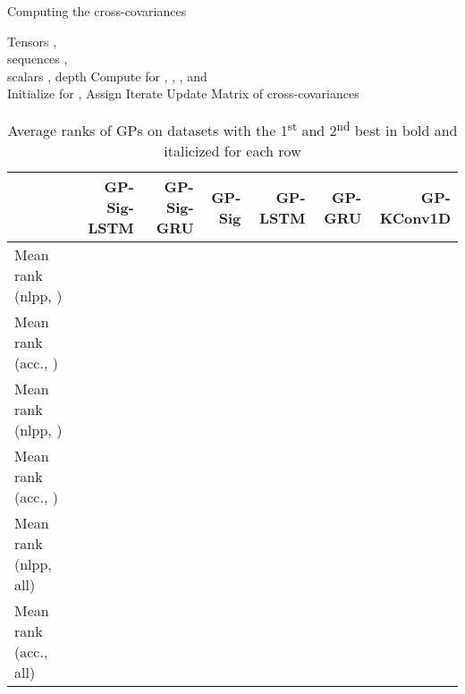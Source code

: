 \documentclass{article}
\begin{document}
	\begin{algorithm}[t]
		\caption{Computing the cross-covariances }
		\label{alg:cross_cov}
		\begin{algorithmic}[1]
			 Tensors , \\ sequences , \\ scalars , depth  
			\STATE Compute  for , , ,  and  \\
			\STATE Initialize  for , 
			\STATE Assign 
			\STATE Iterate 
			\ENDFOR
			\STATE Update 
			\ENDFOR
			 Matrix of cross-covariances 
		\end{algorithmic}
	\end{algorithm}
	
\begin{table*}[t]
	\caption{Average ranks of GPs on datasets \cite{baydogan2015multivarate} with the 1\textsuperscript{st} and 2\textsuperscript{nd} best in bold and italicized for each row}
	\label{table:avg_ranks}
\begin{center}
		\begin{small}
			\begin{sc}
				\begin{tabular}{lrrrrrr}\toprule
					 & GP-Sig-LSTM & GP-Sig-GRU & GP-Sig & GP-LSTM & GP-GRU & GP-KConv1D \\
					\midrule
					Mean rank (nlpp, ) &  &  &  &  &  &  \\
					Mean rank (acc., ) &  &  &  &  &  &  \\
					Mean rank (nlpp, ) &  &  &  &  &  &  \\
					Mean rank (acc., ) &  &  &  &  &  &  \\
					Mean rank (nlpp, all) &  &  &  &  &  &  \\
					Mean rank (acc., all) &  &  &  &  &  &  \\
					\bottomrule
				\end{tabular}
			\end{sc}
		\end{small}
	\end{center}
\end{table*}
\end{document}
